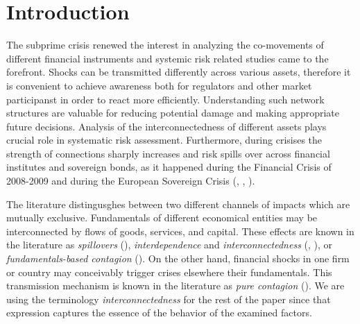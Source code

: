 \documentclass[12pt,bibliography=totoc]{article}
\begin{document}
\newpage

\section{Introduction}

The subprime crisis renewed the interest in analyzing the co-movements of different financial instruments and systemic risk related studies came to the forefront. 
Shocks can be transmitted differently across various assets, therefore it is convenient to achieve awareness both for regulators and other market participanst in order to react more efficiently. 
Understanding such network structures are valuable for reducing potential damage and making appropriate future decisions. 
Analysis of the interconnectedness of different assets plays crucial role in systematic risk assessment. 
Furthermore, during crisises the strength of connections sharply increases and risk spills over across financial institutes and sovereign bonds, as it happened during the Financial Crisis of 2008-2009 and during the European Sovereign Crisis (\cite{diebold2012better}, \cite{diebold2014network}, \cite{demirer2018estimating}).

The literature distingusghes between two different channels of impacts which are mutually exclusive.
Fundamentals of different economical entities may be interconnected by flows of goods, services, and capital. 
These effects are known in the literature as \textit{spillovers} (\cite{masson1999contagion}), \textit{interdependence} and \textit{interconnectedness}  (\cite{forbes2002no}, \cite{forbes2012big}), or \textit{fundamentals-based contagion} (\cite{kaminsky2000crises}). 
On the other hand, financial shocks in one firm or country may conceivably trigger crises elsewhere their fundamentals. This transmission mechanism is known in the literature as \textit{pure contagion} (\cite{masson1999contagion}). We are using the terminology \textit{interconnectedness} for the rest of the paper since that expression captures the essence of the behavior of the examined factors.
\end{document}
